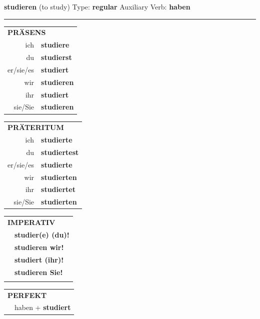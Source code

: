 \documentclass[10pt,a4paper]{revtex4-2}
\begin{document}
\begin{verbbox}
    {\Large \bf studieren} (to study) \hfill Type: \textbf{regular} \hfill Auxiliary Verb: \textbf{haben} 
    
     \vspace{5pt}

    \hrule
    
    \vspace{5pt}

  \begin{tabular}{rl}
     \multicolumn{2}{l}{\textbf{PRÄSENS} }\\
    ich & \textbf{studiere}\\
    du & \textbf{studierst}\\
    er/sie/es & \textbf{studiert}\\
    wir & \textbf{studieren}\\
    ihr & \textbf{studiert}\\
    sie/Sie & \textbf{studieren}\\
  \end{tabular}
  \hfill
     \begin{tabular}{rl}
    \multicolumn{2}{l}{\textbf{PRÄTERITUM} }\\
    ich & \textbf{studierte}\\
    du & \textbf{studiertest}\\
    er/sie/es & \textbf{studierte}\\
    wir & \textbf{studierten}\\
    ihr & \textbf{studiertet}\\
    sie/Sie & \textbf{studierten}\\
  \end{tabular}
  \hfill
  \begin{tabular}{rl}
     \multicolumn{2}{l}{\textbf{IMPERATIV} }\\
   & \textbf{studier(e) (du)!}\\
   & \textbf{studieren wir!}\\
   & \textbf{studiert (ihr)!}\\
   & \textbf{studieren Sie!}\\
   & \vspace{10pt}
  \end{tabular}

    \vspace{10pt}

 \begin{tabular}{rl}
     \multicolumn{2}{l}{\textbf{PERFEKT}}\\
   & haben + \textbf{studiert}\\
  \end{tabular}
\hfill
   \begin{tabular}{rl}
   

\end{tabular}
\end{verbbox}
\end{document}

